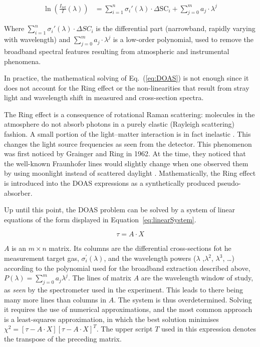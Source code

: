 \begin{equation}
    \label{eq:DOAS}
    \begin{aligned}
        \ln\left( \frac{I_\mathrm{ref}}{I}(\lambda) \right) &= \sum_{i = 1}^{n} \sigma_{i}{'}(\lambda) 
            \cdot \Delta \mathrm{SC}_{i} + \sum_{j = 0}^{m} a_{j} \cdot \lambda^{j}
    \end{aligned}
\end{equation}

Where $\sum_{i = 1}^{n} \sigma_{i}{'}(\lambda) \cdot \Delta SC_{i}$ is
the differential part (narrowband, rapidly varying with wavelength) and
$\sum_{j = 0}^{m} a_{j} \cdot \lambda^{j}$ is a low-order polynomial,
used to remove the broadband spectral features resulting from
atmospheric and instrumental phenomena.

In practice, the mathematical solving of Eq.~(\ref{eq:DOAS}) is not
enough since it does not account for the Ring effect or the
non-linearities that result from stray light and wavelength shift in
measured and cross-section spectra.

The Ring effect is a consequence of rotational Raman scattering:
molecules in the atmosphere do not absorb photons in a purely elastic
(Rayleigh scattering) fashion. A small portion of the light--matter
interaction is in fact inelastic \cite{Brinkmann1968,Merlaud2013}. This
changes the light source frequencies as seen from the detector. This
phenomenon was first noticed by Grainger and Ring in 1962. At the time,
they noticed that the well-known Fraunhofer lines would slightly change
when one  observed them by using moonlight instead of scattered daylight
\cite{GRAINGER1962}. Mathematically, the Ring effect is introduced into
the \gls{DOAS} expressions as a synthetically produced pseudo-absorber.

Up until this point, the \gls{DOAS} problem can be solved by a system of
linear equations of the form displayed in
Equation~\ref{eq:linearSystem}.

\begin{equation}
    \label{eq:linearSystem}
    \tau = A \cdot X
\end{equation}

$A$ is an $m \times n$ matrix. Its columns are the differential
cross-sections fot he measurement target gas, $\sigma_{i}^{'}(\lambda)$,
and the wavelength powers ($\lambda$ ,$\lambda^2$, $\lambda^3$, \ldots)
according to the polynomial used for the broadband extraction described
above, $P(\lambda)=\sum_{j=0}^{m} a_{j}\lambda^{j}$. The lines of matrix
$A$ are the wavelength window of study, as \emph{seen} by the
spectrometer used in the experiment. This leads to there being many more
lines than columns in $A$. The system is thus overdetermined. Solving it
requires the use of numerical approximations, and the most common
approach is a least-squares approximation, in which the best solution
minimises $\chi^2=\left[\tau - A \cdot X\right]\left[\tau - A \cdot
X\right]^T$. The upper script $T$ used in this expression denotes the
transpose of the preceding matrix.

